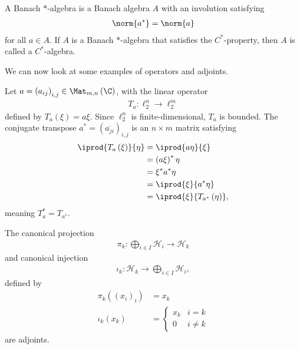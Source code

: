 \documentclass[10pt]{mypackage}
\begin{document}
\begin{definition}
  A Banach $\ast$-algebra is a Banach algebra $A$ with an involution satisfying
  \begin{align*}
    \norm{a^{\ast}} = \norm{a}
  \end{align*}
  for all $a\in A$. If $A$ is a Banach $\ast$-algebra that satisfies the $C^{\ast}$-property, then $A$ is called a $C^{\ast}$-algebra.
\end{definition}
We can now look at some examples of operators and adjoints.
\begin{example}[Matrices]
  Let $a = \left(a_{ij}\right)_{i,j}\in \Mat_{m,n}\left(\C\right)$, with the linear operator
  \begin{align*}
    T_{a}\colon \ell_{2}^{n}\rightarrow \ell_{2}^{m}
  \end{align*}
  defined by $T_a\left(\xi\right) = a\xi$. Since $\ell_2^{n}$ is finite-dimensional, $T_a$ is bounded. The conjugate transpose $a^{\ast} = \left(\overline{a_{ji}}\right)_{i,j}$ is an $n\times m$ matrix satisfying
  \begin{align*}
    \iprod{T_{a}\left(\xi\right)}{\eta} &= \iprod{a\eta}{\xi}\\
                                        &= \left(a\xi\right)^{\ast}\eta\\
                                        &= \xi^{\ast}a^{\ast}\eta\\
                                        &= \iprod{\xi}{a^{\ast}\eta}\\
                                        &= \iprod{\xi}{T_{a^{\ast}}\left(\eta\right)},
  \end{align*}
  meaning $T_{a}^{\ast} = T_{a^{\ast}}$.
\end{example}
\begin{example}
  The canonical projection
  \begin{align*}
    \pi_k\colon \bigoplus_{i\in I}\mathcal{H}_i \rightarrow \mathcal{H}_k
  \end{align*}
  and canonical injection
  \begin{align*}
    \iota_k\colon \mathcal{H}_k \rightarrow \bigoplus_{i\in I}\mathcal{H}_i,
  \end{align*}
  defined by
  \begin{align*}
    \pi_k\left(\left(x_i\right)_i\right) &= x_k\\
    \iota_k\left(x_k\right) &= \begin{cases}
      x_k & i=k\\
      0 & i\neq k
    \end{cases}
  \end{align*}
  are adjoints.
\end{example}
\end{document}
